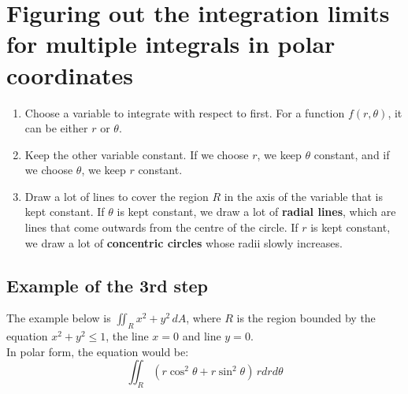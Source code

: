 \documentclass[11pt]{article}
\begin{document}
\section{Figuring out the integration limits for multiple integrals in polar coordinates}
\label{sec:org86ccd26}
\begin{enumerate}
\item Choose a variable to integrate with respect to first. For a function \(f(r, \theta)\), it can be either \(r\) or \(\theta\).
\item Keep the other variable constant. If we choose \(r\), we keep \(\theta\) constant, and if we choose \(\theta\), we keep \(r\) constant.
\item Draw a lot of lines to cover the region \(R\) in the axis of the variable that is kept constant. If \(\theta\) is kept constant, we draw a lot of \textbf{radial lines}, which are lines that come outwards from the centre of the circle. If \(r\) is kept constant, we draw a lot of \textbf{concentric circles} whose radii slowly increases.
\end{enumerate}

\subsection{Example of the 3rd step}
\label{sec:org488304a}
The example below is \(\iint_R x^2 + y^2 \, dA\), where \(R\) is the region bounded by the equation \(x^2 + y^2 \le 1\), the line \(x = 0\) and line \(y = 0\).  \\

In polar form, the equation would be:
\[\iint_R (r \cos^2 \theta + r \sin^2 \theta) \, r dr d \theta\]
\end{document}
